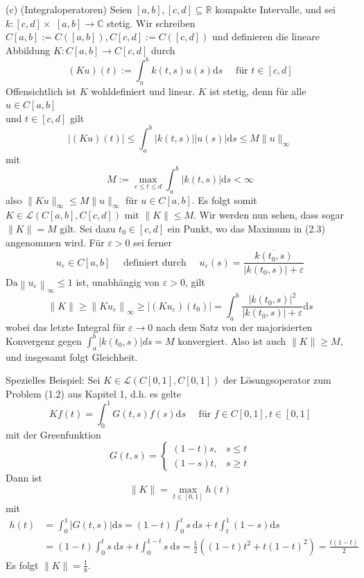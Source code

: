 \documentclass[10pt, letterpaper]{article}
\begin{document}
(c) (Integraloperatoren) Seien $[a, b],[c, d] \subseteq \mathbb{R}$ kompakte Intervalle, und sei $k:[c, d] \times$ $[a, b] \rightarrow \mathbb{C}$ stetig. Wir schreiben $C[a, b]:=C([a, b]), C[c, d]:=C([c, d])$ und definieren die lineare Abbildung $K: C[a, b] \rightarrow C[c, d]$ durch
$$
(K u)(t):=\int_{a}^{b} k(t, s) u(s) \mathrm{d} s \quad \text { für } t \in[c, d]
$$
Offensichtlich ist $K$ wohldefiniert und linear. $K$ ist stetig, denn für alle $u \in C[a, b]$\\
und $t \in[c, d]$ gilt
$$
|(K u)(t)| \leq \int_{a}^{b}|k(t, s)||u(s)| \mathrm{d} s \leq M\|u\|_{\infty}
$$
mit
$$
M:=\max _{c \leq t \leq d} \int_{a}^{b}|k(t, s)| \mathrm{d} s<\infty
$$
also $\|K u\|_{\infty} \leq M\|u\|_{\infty}$ für $u \in C[a, b]$. Es folgt somit $K \in \mathcal{L}(C[a, b], C[c, d])$ mit $\|K\| \leq M$. Wir werden nun sehen, dass sogar $\|K\|=M$ gilt. Sei dazu $t_{0} \in[c, d]$ ein Punkt, wo das Maximum in (2.3) angenommen wird. Für $\varepsilon>0$ sei ferner
$$
u_{\varepsilon} \in C[a, b] \quad \text { definiert durch } \quad u_{\varepsilon}(s)=\frac{\overline{k\left(t_{0}, s\right)}}{\left|k\left(t_{0}, s\right)\right|+\varepsilon}
$$
$\mathrm{Da}\left\|u_{\varepsilon}\right\|_{\infty} \leq 1$ ist, unabhängig von $\varepsilon>0$, gilt
$$
\|K\| \geq\left\|K u_{\varepsilon}\right\|_{\infty} \geq\left|\left(K u_{\varepsilon}\right)\left(t_{0}\right)\right|=\int_{a}^{b} \frac{\left|k\left(t_{0}, s\right)\right|^{2}}{\left|k\left(t_{0}, s\right)\right|+\varepsilon} \mathrm{d} s
$$
wobei das letzte Integral für $\varepsilon \rightarrow 0$ nach dem Satz von der majorisierten Konvergenz gegen $\int_{a}^{b}\left|k\left(t_{0}, s\right)\right| d s=M$ konvergiert. Also ist auch $\|K\| \geq M$, und insgesamt folgt Gleichheit. 

Spezielles Beispiel: Sei $K \in \mathcal{L}(C[0,1], C[0,1])$ der Lösungsoperator zum Problem (1.2) aus Kapitel 1, d.h. es gelte
$$
K f(t)=\int_{0}^{1} G(t, s) f(s) \mathrm{d} s \quad \text { für } f \in C[0,1], t \in[0,1]
$$
mit der Greenfunktion
$$
G(t, s)= \begin{cases}(1-t) s, & s \leq t \\ (1-s) t, & s \geq t\end{cases}
$$
Dann ist
$$
\|K\|=\max _{t \in[0,1]} h(t)
$$
mit
$$
\begin{aligned}
h(t) & =\int_{0}^{1}|G(t, s)| \mathrm{d} s=(1-t) \int_{0}^{t} s \mathrm{~d} s+t \int_{t}^{1}(1-s) \mathrm{d} s \\
& =(1-t) \int_{0}^{t} s \mathrm{~d} s+t \int_{0}^{1-t} s \mathrm{~d} s=\frac{1}{2}\left((1-t) t^{2}+t(1-t)^{2}\right)=\frac{t(1-t)}{2}
\end{aligned}
$$
Es folgt $\|K\|=\frac{1}{8}$.
\end{document}
